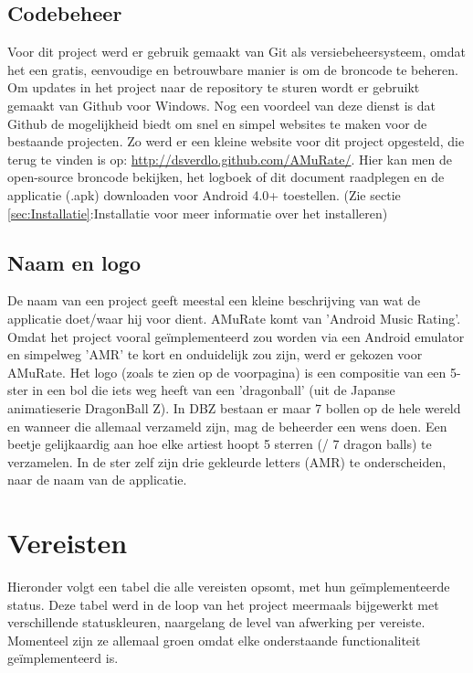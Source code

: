 \documentclass[11pt,a4paper]{article}
\begin{document}
	
	\subsection{Codebeheer}
	\label{sec:Codebeheer}
		Voor dit project werd er gebruik gemaakt van Git als versiebeheersysteem, omdat het een gratis, eenvoudige en betrouwbare manier is om de broncode te beheren. Om updates in het project naar de repository te sturen wordt er gebruikt gemaakt van Github voor Windows. Nog een voordeel van deze dienst is dat Github de mogelijkheid biedt om snel en simpel websites te maken voor de bestaande projecten. Zo werd er een kleine website voor dit project opgesteld, die terug te vinden is op: \url{http://dsverdlo.github.com/AMuRate/}. Hier kan men de open-source broncode bekijken, het logboek of dit document raadplegen en de applicatie (.apk) downloaden voor Android 4.0+ toestellen. (Zie sectie \ref{sec:Installatie}:Installatie voor meer informatie over het installeren)
		
	\subsection{Naam en logo}
	\label{sec:Naam en logo}
		De naam van een project geeft meestal een kleine beschrijving van wat de applicatie doet/waar hij voor dient. AMuRate komt van 'Android Music Rating'. Omdat het project vooral geïmplementeerd zou worden via een Android emulator en simpelweg 'AMR' te kort en onduidelijk zou zijn, werd er gekozen voor AMuRate. Het logo (zoals te zien op de voorpagina) is een compositie van een 5-ster in een bol die iets weg heeft van een 'dragonball' (uit de Japanse animatieserie DragonBall Z). In DBZ bestaan er maar 7 bollen op de hele wereld en wanneer die allemaal verzameld zijn, mag de beheerder een wens doen. Een beetje gelijkaardig aan hoe elke artiest hoopt 5 sterren (/ 7 dragon balls) te verzamelen. 
	In de ster zelf zijn drie gekleurde letters (AMR) te onderscheiden, naar de naam van de applicatie.
	
	
\newpage %
\section{Vereisten}
\label{sec:Vereisten}
Hieronder volgt een tabel die alle vereisten opsomt, met hun geïmplementeerde status. Deze tabel werd in de loop van het project meermaals bijgewerkt met verschillende statuskleuren, naargelang de level van afwerking per vereiste. Momenteel zijn ze allemaal groen omdat elke onderstaande functionaliteit geïmplementeerd is.
\end{document}
